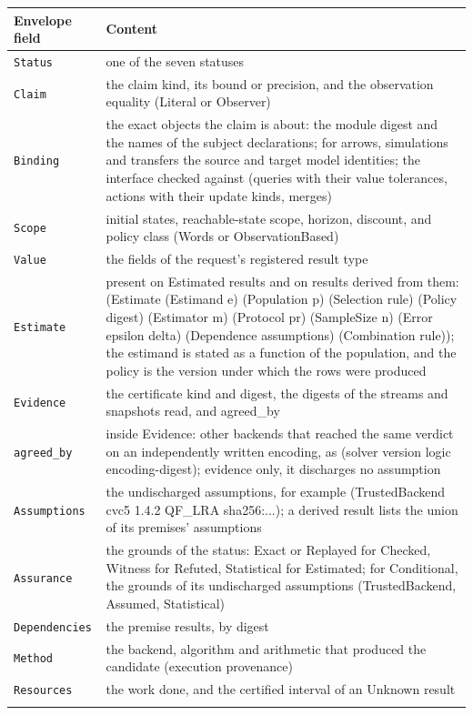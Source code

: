 \documentclass[11pt]{article}
\newcommand{\code}[1]{\texttt{#1}}
\theoremstyle{definition}
\theoremstyle{plain}
\begin{document}
{\footnotesize\begin{longtable}{>{\raggedright\arraybackslash}p{3.0cm}>{\raggedright\arraybackslash}p{11.4cm}}
\toprule Envelope field & Content\\ \midrule \endhead
\code{Status} & one of the seven statuses\\ \addlinespace[3pt]
\code{Claim} & the claim kind,\allowbreak{} its bound or precision,\allowbreak{} and the observation equality (Literal or Observer)\\ \addlinespace[3pt]
\code{Binding} & the exact objects the claim is about: the module digest and the names of the subject declarations; for arrows,\allowbreak{} simulations and transfers the source and target model identities; the interface checked against (queries with their value tolerances,\allowbreak{} actions with their update kinds,\allowbreak{} merges)\\ \addlinespace[3pt]
\code{Scope} & initial states,\allowbreak{} reachable-state scope,\allowbreak{} horizon,\allowbreak{} discount,\allowbreak{} and policy class (Words or ObservationBased)\\ \addlinespace[3pt]
\code{Value} & the fields of the request's registered result type\\ \addlinespace[3pt]
\code{Estimate} & present on Estimated results and on results derived from them: (Estimate (Estimand e) (Population p) (Selection rule) (Policy digest) (Estimator m) (Protocol pr) (SampleSize n) (Error epsilon delta) (Dependence assumptions) (Combination rule)); the estimand is stated as a function of the population,\allowbreak{} and the policy is the version under which the rows were produced\\ \addlinespace[3pt]
\code{Evidence} & the certificate kind and digest,\allowbreak{} the digests of the streams and snapshots read,\allowbreak{} and agreed\_by\\ \addlinespace[3pt]
\code{agreed\_by} & inside Evidence: other backends that reached the same verdict on an independently written encoding,\allowbreak{} as (solver version logic encoding-digest); evidence only,\allowbreak{} it discharges no assumption\\ \addlinespace[3pt]
\code{Assumptions} & the undischarged assumptions,\allowbreak{} for example (TrustedBackend cvc5 1.4.2 QF\_LRA sha256:...); a derived result lists the union of its premises' assumptions\\ \addlinespace[3pt]
\code{Assurance} & the grounds of the status: Exact or Replayed for Checked,\allowbreak{} Witness for Refuted,\allowbreak{} Statistical for Estimated; for Conditional,\allowbreak{} the grounds of its undischarged assumptions (TrustedBackend,\allowbreak{} Assumed,\allowbreak{} Statistical)\\ \addlinespace[3pt]
\code{Dependencies} & the premise results,\allowbreak{} by digest\\ \addlinespace[3pt]
\code{Method} & the backend,\allowbreak{} algorithm and arithmetic that produced the candidate (execution provenance)\\ \addlinespace[3pt]
\code{Resources} & the work done,\allowbreak{} and the certified interval of an Unknown result\\ \addlinespace[3pt]
\bottomrule\end{longtable}}
\end{document}
